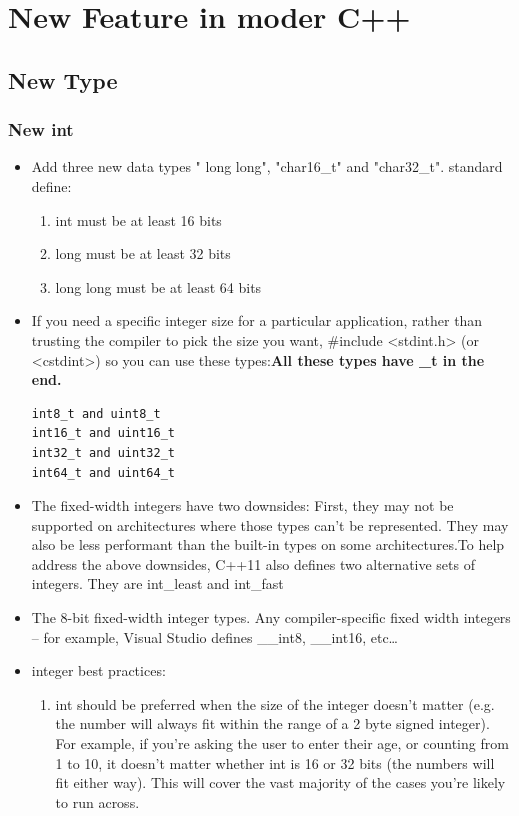 \documentclass[a4paper,11pt,twoside]{book}
\begin{document}
\chapter{New Feature in moder C++}

\section{New Type}

\subsection{New int}

\begin{itemize}
\item Add three new data types " long long", "char16\_t"  and "char32\_t". standard define:
\begin{enumerate}
\item int must be at least 16 bits
\item long must be at least 32 bits
\item long long must be at least 64 bits
\end{enumerate}

\item If you need a specific integer size for a particular application, rather than trusting the compiler to pick the size you want, \#include <stdint.h> (or <cstdint>) so you can use these types:\textbf{All these types have \_t in the end.}
\begin{lstlisting}[numbers=none]
int8_t and uint8_t
int16_t and uint16_t
int32_t and uint32_t
int64_t and uint64_t
\end{lstlisting}

\item The fixed-width integers have two downsides: First, they may not be supported on architectures where those types can't be represented. They may also be less performant than the built-in types on some architectures.To help address the above downsides, C++11 also defines two alternative sets of integers. They are int\_least and int\_fast  

\item The 8-bit fixed-width integer types.
Any compiler-specific fixed width integers -- for example, Visual Studio defines \_\_int8, \_\_int16, etc…


\item integer best practices:
\begin{enumerate}
	\item int should be preferred when the size of the integer doesn't matter (e.g. the number will always fit within the range of a 2 byte signed integer). For example, if you're asking the user to enter their age, or counting from 1 to 10, it doesn't matter whether int is 16 or 32 bits (the numbers will fit either way). This will cover the vast majority of the cases you're likely to run across.
	

\end{enumerate}
\end{itemize}
\end{document}
